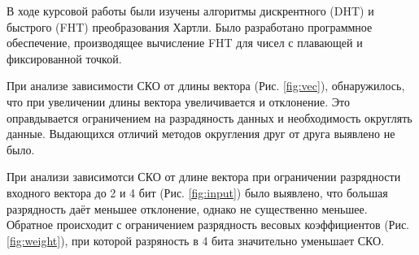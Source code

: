 \documentclass[12pt, a4paper] {ncc}
\begin{document}
В ходе курсовой работы были изучены алгоритмы дискрентного (DHT) и быстрого (FHT)
преобразования Хартли. Было разработано программное обеспечение, производящее вычисление
FHT для чисел с плавающей и фиксированной точкой. 

При анализе зависимости СКО от длины вектора (Рис. \ref{fig:vec}), обнаружилось, что при увеличении длины вектора
увеличивается и отклонение. Это оправдывается ограничением на разрадяность данных и необходимость
округлять данные. Выдающихся отличий методов округления друг от друга выявлено не было.

При анализи зависимотси СКО от длине вектора при ограничении разрядности входного вектора до 2 и 4 бит (Рис. \ref{fig:input})
было выявлено, что большая разрядность даёт меньшее отклонение, однако не существенно меньшее. Обратное
происходит с ограничением разрядность весовых коэффициентов (Рис. \ref{fig:weight}), при которой разряность в
4 бита значительно уменьшает СКО.
\end{document}

